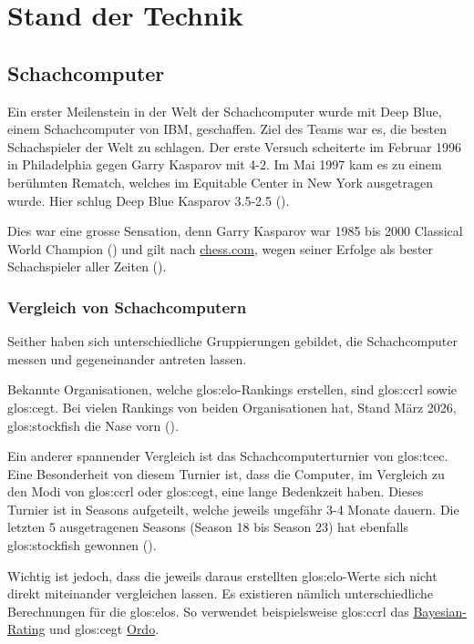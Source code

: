 \chapter{Stand der Technik}


\section{Schachcomputer}
Ein erster Meilenstein in der Welt der Schachcomputer wurde mit Deep Blue, einem Schachcomputer von IBM, geschaffen. Ziel des Teams war es, die besten
Schachspieler der Welt zu schlagen. Der erste Versuch scheiterte im Februar 1996 in Philadelphia gegen Garry Kasparov mit 4-2.
Im Mai 1997 kam es zu einem berühmten Rematch, welches im Equitable Center in New York ausgetragen wurde.
Hier schlug Deep Blue Kasparov 3.5-2.5 (\cite{deepBlueIbm}).

Dies war eine grosse Sensation, denn Garry Kasparov war 1985 bis 2000 Classical World Champion (\cite{worldChessChampion})
und gilt nach \href{https://www.chess.com/}{chess.com}, wegen seiner Erfolge als bester Schachspieler aller Zeiten (\cite{bestChessPlayerOfAllTime}).

\subsection{Vergleich von Schachcomputern}
\label{subsec:vergleichSchachcomputer}
Seither haben sich unterschiedliche Gruppierungen gebildet, die Schachcomputer messen und gegeneinander antreten lassen.

Bekannte Organisationen, welche \gls{glos:elo}-Rankings erstellen, sind \gls{glos:ccrl} sowie \gls{glos:cegt}. Bei
vielen Rankings von beiden Organisationen hat, Stand März 2026, \gls{glos:stockfish} die Nase vorn (\cite{ccrlRating,cegtRating}).

Ein anderer spannender Vergleich ist das Schachcomputerturnier von \gls{glos:tcec}.
Eine Besonderheit von diesem Turnier ist, dass die Computer, im Vergleich zu den Modi von \gls{glos:ccrl} oder \gls{glos:cegt},
eine lange Bedenkzeit haben.
Dieses Turnier ist in Seasons aufgeteilt, welche jeweils ungefähr 3-4 Monate dauern. Die letzten 5 ausgetragenen Seasons
(Season 18 bis Season 23) hat ebenfalls \gls{glos:stockfish} gewonnen (\cite{tcecWebseite}).

Wichtig ist jedoch, dass die jeweils daraus erstellten \gls{glos:elo}-Werte sich nicht direkt miteinander vergleichen lassen.
Es existieren nämlich unterschiedliche Berechnungen für die \glspl{glos:elo}. So verwendet beispielsweise \gls{glos:ccrl} das
\href{https://www.remi-coulom.fr/Bayesian-Elo/}{Bayesian-Rating} und \gls{glos:cegt} \href{https://github.com/michiguel/Ordo}{Ordo}.

